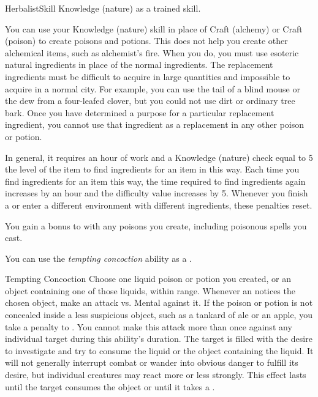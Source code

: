     \begin{feat}{Herbalist}{Skill}
        \featpre Knowledge (nature) as a trained skill.

         You can use your Knowledge (nature) skill in place of Craft (alchemy) or Craft (poison) to create poisons and potions.
        This does not help you create other alchemical items, such as alchemist's fire.
        When you do, you must use esoteric natural ingredients in place of the normal ingredients.
        The replacement ingredients must be difficult to acquire in large quantities and impossible to acquire in a normal city.
        For example, you can use the tail of a blind mouse or the dew from a four-leafed clover, but you could not use dirt or ordinary tree bark.
        Once you have determined a purpose for a particular replacement ingredient, you cannot use that ingredient as a replacement in any other poison or potion.

        In general, it requires an hour of work and a Knowledge (nature) check equal to 5 \add the level of the item to find ingredients for an item in this way.
        Each time you find ingredients for an item this way, the time required to find ingredients again increases by an hour and the difficulty value increases by 5.
        Whenever you finish a  or enter a different environment with different ingredients, these penalties reset.

         You gain a  bonus to  with any poisons you create, including poisonous spells you cast.

         You can use the \textit{tempting concoction} ability as a .
        \begin{attuneability}{Tempting Concoction}
            \rankline
            Choose one liquid poison or potion you created, or an object containing one of those liquids, within \rngshort range.
            Whenever an  notices the chosen object, make an attack vs. Mental against it.
            If the poison or potion is not concealed inside a less suspicious object, such as a tankard of ale or an apple, you take a  penalty to .
            You cannot make this attack more than once against any individual target during this ability's duration.
            \hit The target is filled with the desire to investigate and try to consume the liquid or the object containing the liquid.
            It will not generally interrupt combat or wander into obvious danger to fulfill its desire, but individual creatures may react more or less strongly.
            This effect lasts until the target consumes the object or until it takes a .


\end{attuneability}
\end{feat}
